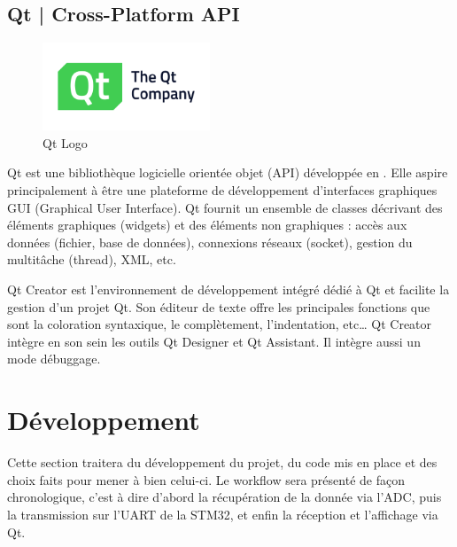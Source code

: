 \documentclass[11pt, french]{article}
\begin{document}
\newpage

\subsection{Qt | Cross-Platform API}

\vspace*{0.1cm}
\begin{figure}[htb]
\centering
\includegraphics[width=5cm]{TheQtCompany_logo_1200x630.png}
\caption{Qt Logo}
\label{fig:qt}
\end{figure}
\vspace*{0.1cm}

Qt est une bibliothèque logicielle orientée objet (API) développée en \CC. Elle aspire principalement à être une plateforme de développement d’interfaces graphiques GUI (Graphical User Interface). Qt fournit un ensemble de classes décrivant des éléments graphiques (widgets) et des éléments non graphiques : accès aux données (fichier, base de données), connexions réseaux (socket), gestion du multitâche (thread), XML, etc.

Qt Creator est l’environnement de développement intégré dédié à Qt et facilite la gestion d’un projet Qt. Son éditeur de texte offre les principales fonctions que sont la coloration syntaxique, le complètement, l’indentation, etc… Qt Creator intègre en son sein les outils Qt Designer et Qt Assistant. Il intègre aussi un mode débuggage.

\newpage

\section{Développement}
Cette section traitera du développement du projet, du code mis en place et des choix faits pour mener à bien celui-ci. Le workflow sera présenté de façon chronologique, c'est à dire d'abord la récupération de la donnée via l'ADC, puis la transmission sur l'UART de la STM32, et enfin la réception et l'affichage via Qt.\\
\end{document}
